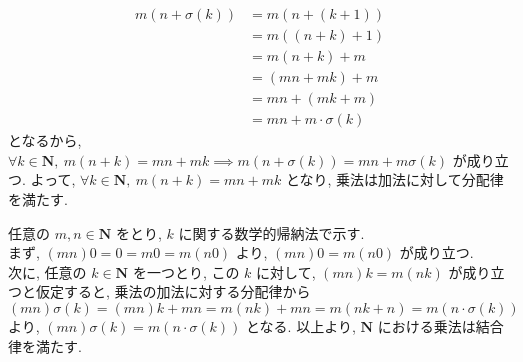 \begin{nmprob}
{\begin{align*}
m(n + \sigma (k)) &= m(n + (k + 1))\\
&= m((n + k) + 1)\\
&= m(n + k) + m\\
&= (mn + mk) + m\\
&= mn + (mk + m)\\
&= mn + m\cdot \sigma (k)
\end{align*}
となるから, $\forall k \in \bm{N},\ m(n + k) = mn + mk \implies m(n + \sigma (k)) = mn + m\sigma (k)$ が成り立つ.
よって, $\forall k \in \bm{N},\ m(n + k) = mn + mk$ となり, 乗法は加法に対して分配律を満たす.
\item 任意の $m, n\in \bm{N}$ をとり, $k$ に関する数学的帰納法で示す.\\
まず, $(mn)0 = 0 = m0 = m(n0)$ より, $(mn)0 = m(n0)$ が成り立つ.\\
次に, 任意の $k \in \bm{N}$ を一つとり, この $k$ に対して, $(mn)k = m(nk)$ が成り立つと仮定すると, 乗法の加法に対する分配律から
$(mn)\sigma (k) = (mn)k + mn = m(nk) + mn = m(nk + n) = m(n \cdot \sigma (k))$ より, $(mn) \sigma (k) = m(n\cdot \sigma (k))$ となる.
以上より, $\bm{N}$ における乗法は結合律を満たす.
}
\end{nmprob}